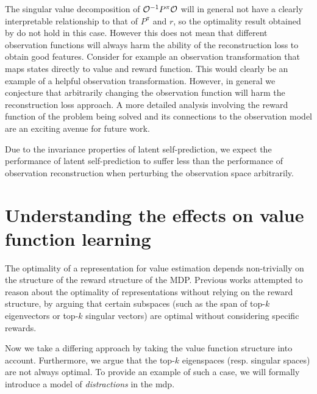 The singular value decomposition of ${\mathcal{O}}^{-1}P^\pi{\mathcal{O}}$ will in general not have a clearly interpretable relationship to that of $P^\pi$ and $r$, so the optimality result obtained by \textcite{behzadian2019fast} do not hold in this case.
However this does not mean that different observation functions will always harm the ability of the reconstruction loss to obtain good features.
Consider for example an observation transformation that maps states directly to value and reward function.
This would clearly be an example of a helpful observation transformation.
However, in general we conjecture that arbitrarily changing the observation function will harm the reconstruction loss approach.
A more detailed analysis involving the reward function of the problem being solved and its connections to the observation model are an exciting avenue for future work.

\begin{tcolorbox}[boxrule=0.2mm,colback=white,colframe=uoftblue,boxsep=0pt,top=3pt,bottom=5pt]
\begin{insight} 
\label{insight:understanding:2}
Due to the invariance properties of latent self-prediction, we expect the performance of latent self-prediction to suffer less than the performance of observation reconstruction when perturbing the observation space arbitrarily.
\end{insight}
\end{tcolorbox}


\section{Understanding the effects on value function learning}
\label{sec:understanding:auxilliary_tasks}

The optimality of a representation for value estimation depends non-trivially on the structure of the reward structure of the MDP. Previous works \parencite{behzadian2019fast, bellemare2019geometric, lelan2022generalization} attempted to reason about the optimality of representations without relying on the reward structure, by arguing that certain subspaces (such as the span of top-$k$ eigenvectors or top-$k$ singular vectors) are optimal without considering specific rewards.

Now we take a differing approach by taking the value function structure into account. Furthermore, we argue that the top-$k$ eigenspaces (resp. singular spaces) are not always optimal.
To provide an example of such a case, we will formally introduce a model of \emph{distractions} in the \ac{mdp}.

